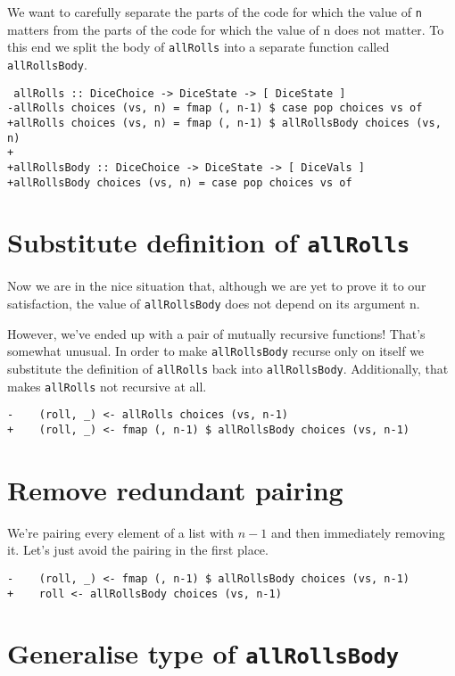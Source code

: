We want to carefully separate the parts of the code for which the value of \texttt{n} matters from the parts of the code for which the value of n does not matter. To this end we split the body of \texttt{allRolls} into a separate function called \texttt{allRollsBody}.

\begin{verbatim}
 allRolls :: DiceChoice -> DiceState -> [ DiceState ]
-allRolls choices (vs, n) = fmap (, n-1) $ case pop choices vs of
+allRolls choices (vs, n) = fmap (, n-1) $ allRollsBody choices (vs, n)
+
+allRollsBody :: DiceChoice -> DiceState -> [ DiceVals ]
+allRollsBody choices (vs, n) = case pop choices vs of
\end{verbatim}


\section{Substitute definition of \texttt{allRolls}}

Now we are in the nice situation that, although we are yet to prove it to our satisfaction, the value of \texttt{allRollsBody} does not depend on its argument n.

However, we've ended up with a pair of mutually recursive functions! That's somewhat unusual. In order to make \texttt{allRollsBody} recurse only on itself we substitute the definition of \texttt{allRolls} back into \texttt{allRollsBody}. Additionally, that makes \texttt{allRolls} not recursive at all.

\begin{verbatim}
-    (roll, _) <- allRolls choices (vs, n-1)
+    (roll, _) <- fmap (, n-1) $ allRollsBody choices (vs, n-1)
\end{verbatim}


\section{Remove redundant pairing}


We're pairing every element of a list with $n-1$ and then immediately removing it. Let's just avoid the pairing in the first place.

\begin{verbatim}
-    (roll, _) <- fmap (, n-1) $ allRollsBody choices (vs, n-1)
+    roll <- allRollsBody choices (vs, n-1)
\end{verbatim}


\section{Generalise type of \texttt{allRollsBody}}


